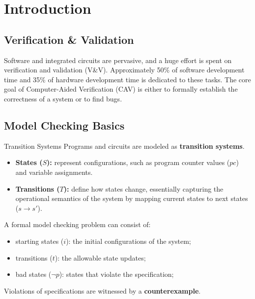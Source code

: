 \documentclass[a4paper, 11pt]{report}
\begin{document}
\makecustomcover

\tableofcontents
\clearpage

\chapter{Introduction}

\section{Verification \& Validation}
Software and integrated circuits are pervasive, and a huge effort is spent on verification and validation (V\&V). Approximately 50\% of software development time and 35\% of hardware development time is dedicated to these tasks. The core goal of Computer-Aided Verification (CAV) is either to formally establish the correctness of a system or to find bugs.

\section{Model Checking Basics}

\begin{defframe}{Transition Systems}{}
Programs and circuits are modeled as \textbf{transition systems}.
\begin{itemize}
    \item \textbf{States ($S$):} represent configurations, such as program counter values ($pc$) and variable assignments.
    \item \textbf{Transitions ($T$):} define how states change, essentially capturing the operational semantics of the system by mapping current states to next states ($s \to s'$).
\end{itemize}
\end{defframe}

A formal model checking problem can consist of:
\begin{itemize}
    \item starting states ($i$): the initial configurations of the system;
    \item transitions ($t$): the allowable state updates;
    \item bad states ($\neg p$): states that violate the specification;
\end{itemize}

Violations of specifications are witnessed by a \textbf{counterexample}.
\end{document}
